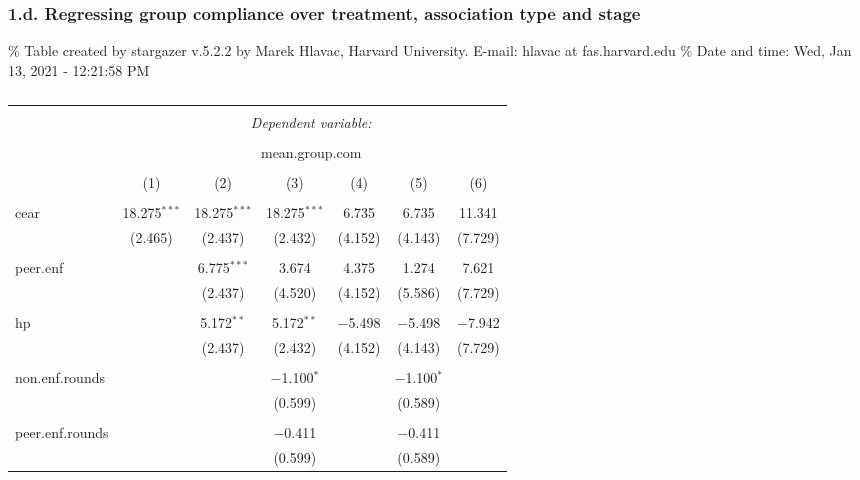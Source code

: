 \documentclass[
]{article}
\begin{document}
\hypertarget{d.-regressing-group-compliance-over-treatment-association-type-and-stage}{%
\subsubsection{1.d. Regressing group compliance over treatment,
association type and
stage}\label{d.-regressing-group-compliance-over-treatment-association-type-and-stage}}

\% Table created by stargazer v.5.2.2 by Marek Hlavac, Harvard
University. E-mail: hlavac at fas.harvard.edu \% Date and time: Wed, Jan
13, 2021 - 12:21:58 PM

\begin{table}[!htbp] \centering 
  \caption{} 
  \label{} 
\begin{tabular}{@{\extracolsep{5pt}}lcccccc} 
\\[-1.8ex]\hline 
\hline \\[-1.8ex] 
 & \multicolumn{6}{c}{\textit{Dependent variable:}} \\ 
\cline{2-7} 
\\[-1.8ex] & \multicolumn{6}{c}{mean.group.com} \\ 
\\[-1.8ex] & (1) & (2) & (3) & (4) & (5) & (6)\\ 
\hline \\[-1.8ex] 
 cear & 18.275$^{***}$ & 18.275$^{***}$ & 18.275$^{***}$ & 6.735 & 6.735 & 11.341 \\ 
  & (2.465) & (2.437) & (2.432) & (4.152) & (4.143) & (7.729) \\ 
  & & & & & & \\ 
 peer.enf &  & 6.775$^{***}$ & 3.674 & 4.375 & 1.274 & 7.621 \\ 
  &  & (2.437) & (4.520) & (4.152) & (5.586) & (7.729) \\ 
  & & & & & & \\ 
 hp &  & 5.172$^{**}$ & 5.172$^{**}$ & $-$5.498 & $-$5.498 & $-$7.942 \\ 
  &  & (2.437) & (2.432) & (4.152) & (4.143) & (7.729) \\ 
  & & & & & & \\ 
 non.enf.rounds &  &  & $-$1.100$^{*}$ &  & $-$1.100$^{*}$ &  \\ 
  &  &  & (0.599) &  & (0.589) &  \\ 
  & & & & & & \\ 
 peer.enf.rounds &  &  & $-$0.411 &  & $-$0.411 &  \\ 
  &  &  & (0.599) &  & (0.589) &  \\ 

\end{tabular}
\end{table}
\end{document}
